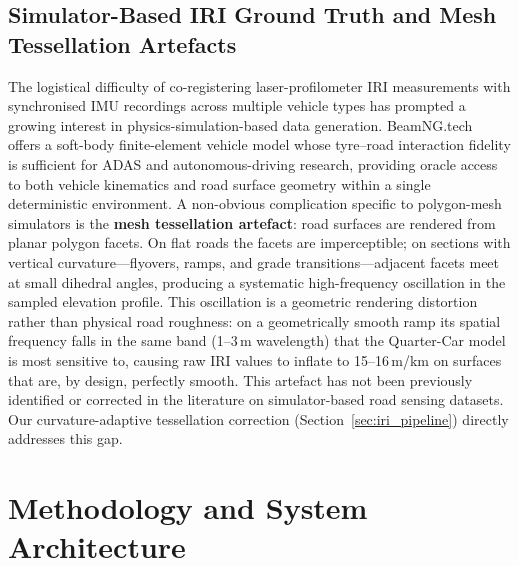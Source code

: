 \documentclass[conference]{IEEEtran}
\begin{document}
\subsection{Simulator-Based IRI Ground Truth and Mesh Tessellation Artefacts}
The logistical difficulty of co-registering laser-profilometer IRI measurements with synchronised IMU recordings across multiple vehicle types has prompted a growing interest in physics-simulation-based data generation.
BeamNG.tech~\cite{15} offers a soft-body finite-element vehicle model whose tyre--road interaction fidelity is sufficient for ADAS and autonomous-driving research, providing oracle access to both vehicle kinematics and road surface geometry within a single deterministic environment.
A non-obvious complication specific to polygon-mesh simulators is the \textbf{mesh tessellation artefact}: road surfaces are rendered from planar polygon facets.
On flat roads the facets are imperceptible; on sections with vertical curvature---flyovers, ramps, and grade transitions---adjacent facets meet at small dihedral angles, producing a systematic high-frequency oscillation in the sampled elevation profile.
This oscillation is a geometric rendering distortion rather than physical road roughness: on a geometrically smooth ramp its spatial frequency falls in the same band (1--3\,m wavelength) that the Quarter-Car model is most sensitive to, causing raw IRI values to inflate to 15--16\,m/km on surfaces that are, by design, perfectly smooth.
This artefact has not been previously identified or corrected in the literature on simulator-based road sensing datasets.
Our curvature-adaptive tessellation correction (Section~\ref{sec:iri_pipeline}) directly addresses this gap.

\section{Methodology and System Architecture}
\end{document}
